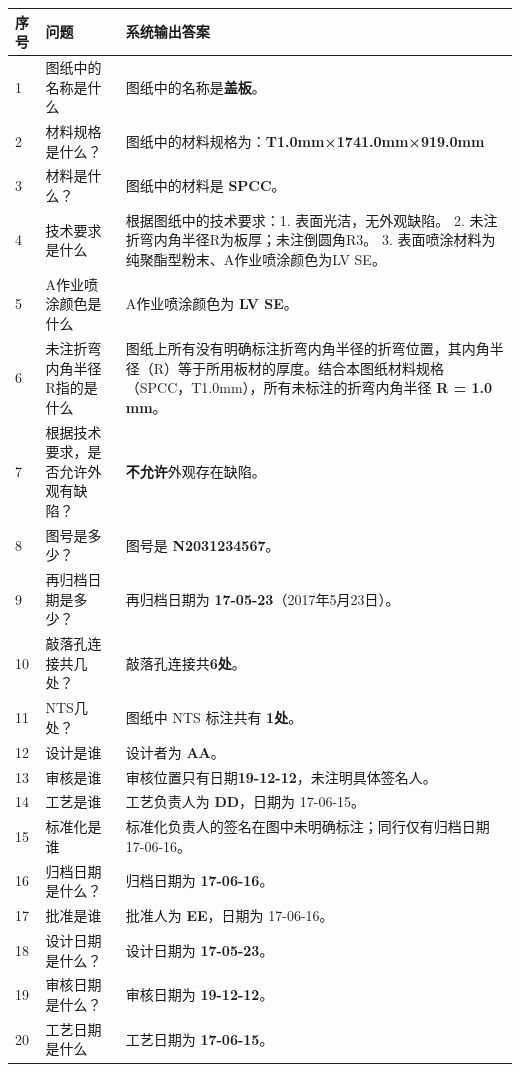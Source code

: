 \documentclass[11pt,a4paper]{article}
\begin{document}
\begin{longtable}{p{}p{}p{}}
\toprule
序号 & 问题 & 系统输出答案 \\
\midrule
\endhead
1 & 图纸中的名称是什么 & 图纸中的名称是\textbf{盖板}。 \\
\hline
2 & 材料规格是什么？ & 图纸中的材料规格为：\textbf{T1.0mm×1741.0mm×919.0mm} \\
\hline
3 & 材料是什么？ & 图纸中的材料是 \textbf{SPCC}。 \\
\hline
4 & 技术要求是什么 & 根据图纸中的技术要求：1. 表面光洁，无外观缺陷。 2. 未注折弯内角半径R为板厚；未注倒圆角R3。 3. 表面喷涂材料为纯聚酯型粉末、A作业喷涂颜色为LV SE。 \\
\hline
5 & A作业喷涂颜色是什么 & A作业喷涂颜色为 \textbf{LV SE}。 \\
\hline
6 & 未注折弯内角半径R指的是什么 & 图纸上所有没有明确标注折弯内角半径的折弯位置，其内角半径（R）等于所用板材的厚度。结合本图纸材料规格（SPCC，T1.0mm），所有未标注的折弯内角半径 \textbf{R = 1.0 mm}。 \\
\hline
7 & 根据技术要求，是否允许外观有缺陷？ & \textbf{不允许}外观存在缺陷。 \\
\hline
8 & 图号是多少？ & 图号是 \textbf{N2031234567}。 \\
\hline
9 & 再归档日期是多少？ & 再归档日期为 \textbf{17-05-23}（2017年5月23日）。 \\
\hline
10 & 敲落孔连接共几处？ & 敲落孔连接共\textbf{6处}。 \\
\hline
11 & NTS几处？ & 图纸中 NTS 标注共有 \textbf{1处}。 \\
\hline
12 & 设计是谁 & 设计者为 \textbf{AA}。 \\
\hline
13 & 审核是谁 & 审核位置只有日期\textbf{19-12-12}，未注明具体签名人。 \\
\hline
14 & 工艺是谁 & 工艺负责人为 \textbf{DD}，日期为 17-06-15。 \\
\hline
15 & 标准化是谁 & 标准化负责人的签名在图中未明确标注；同行仅有归档日期 17-06-16。 \\
\hline
16 & 归档日期是什么？ & 归档日期为 \textbf{17-06-16}。 \\
\hline
17 & 批准是谁 & 批准人为 \textbf{EE}，日期为 17-06-16。 \\
\hline
18 & 设计日期是什么？ & 设计日期为 \textbf{17-05-23}。 \\
\hline
19 & 审核日期是什么？ & 审核日期为 \textbf{19-12-12}。 \\
\hline
20 & 工艺日期是什么 & 工艺日期为 \textbf{17-06-15}。 \\
\bottomrule
\end{longtable}
\end{document}
